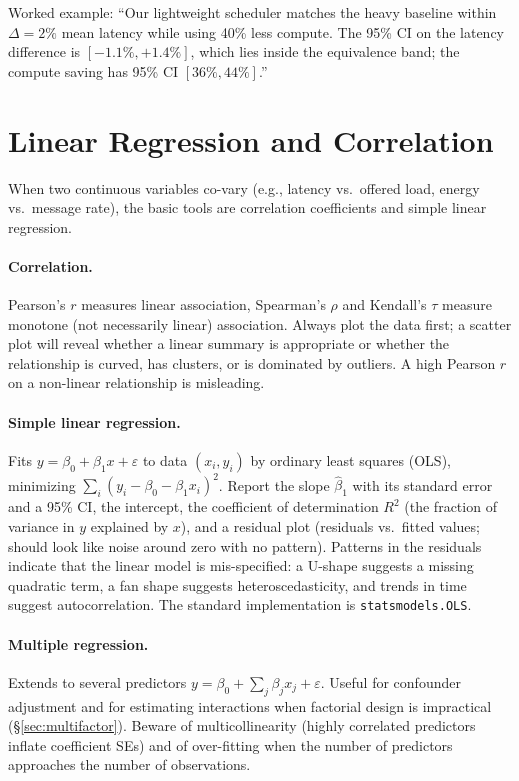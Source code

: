 \documentclass[11pt]{article}
\begin{document}
Worked example: ``Our lightweight scheduler matches the heavy baseline within $\Delta = 2\%$ mean latency while using 40\% less compute. The 95\% CI on the latency difference is $[-1.1\%, +1.4\%]$, which lies inside the equivalence band; the compute saving has 95\% CI $[36\%, 44\%]$.''

\section{Linear Regression and Correlation}
\label{sec:regression}

When two continuous variables co-vary (e.g., latency vs.\ offered load, energy vs.\ message rate), the basic tools are correlation coefficients and simple linear regression.

\paragraph{Correlation.} Pearson's $r$ measures linear association, Spearman's $\rho$ and Kendall's $\tau$ measure monotone (not necessarily linear) association. Always plot the data first; a scatter plot will reveal whether a linear summary is appropriate or whether the relationship is curved, has clusters, or is dominated by outliers. A high Pearson $r$ on a non-linear relationship is misleading.

\paragraph{Simple linear regression.} Fits $y = \beta_0 + \beta_1 x + \varepsilon$ to data $(x_i, y_i)$ by ordinary least squares (OLS), minimizing $\sum_i (y_i - \beta_0 - \beta_1 x_i)^2$. Report the slope $\hat\beta_1$ with its standard error and a 95\% CI, the intercept, the coefficient of determination $R^2$ (the fraction of variance in $y$ explained by $x$), and a residual plot (residuals vs.\ fitted values; should look like noise around zero with no pattern). Patterns in the residuals indicate that the linear model is mis-specified: a U-shape suggests a missing quadratic term, a fan shape suggests heteroscedasticity, and trends in time suggest autocorrelation. The standard implementation is \texttt{statsmodels.OLS}.

\paragraph{Multiple regression.} Extends to several predictors $y = \beta_0 + \sum_j \beta_j x_j + \varepsilon$. Useful for confounder adjustment and for estimating interactions when factorial design is impractical (\S\ref{sec:multifactor}). Beware of multicollinearity (highly correlated predictors inflate coefficient SEs) and of over-fitting when the number of predictors approaches the number of observations.
\end{document}

